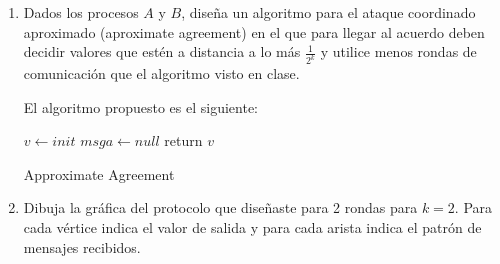 \documentclass[12pt,a4paper]{report}
\begin{document}
\begin{enumerate}
	\item {
		Dados los procesos $A$ y $B$, diseña un algoritmo para el ataque coordinado
		aproximado (aproximate agreement) en el que para llegar al acuerdo deben
		decidir	valores que estén a distancia a lo más $\frac{1}{2^k}$ y utilice
		menos rondas de comunicación que el algoritmo visto en clase.

		El algoritmo propuesto es el siguiente:\\

		\IncMargin{1em}
		\begin{algorithm}
			\BlankLine
			$v \leftarrow init$ \;
			$msga \leftarrow null$\;
			return $v$\;
			\caption{Approximate Agreement}
		\end{algorithm}\DecMargin{1em}
		

	}

	\item {
		Dibuja la gráfica del protocolo que diseñaste para 2 rondas para $k = 2$.
		Para cada vértice indica el valor de salida y para cada arista indica el
		patrón de mensajes recibidos.
	}


\end{enumerate}
\end{document}
